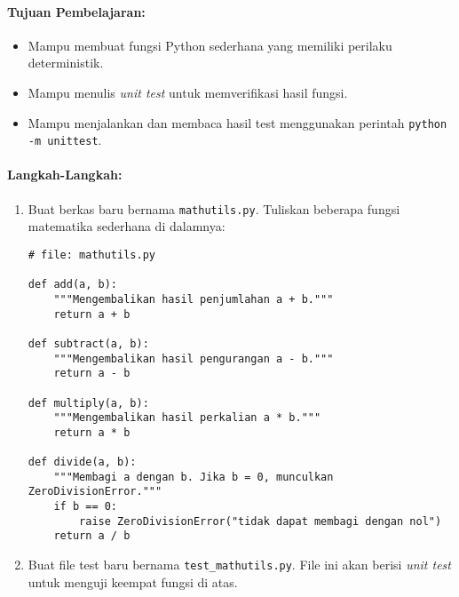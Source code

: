 \paragraph{Tujuan Pembelajaran:}
\begin{itemize}
    \item Mampu membuat fungsi Python sederhana yang memiliki perilaku deterministik.
    \item Mampu menulis \textit{unit test} untuk memverifikasi hasil fungsi.
    \item Mampu menjalankan dan membaca hasil test menggunakan perintah \texttt{python -m unittest}.
\end{itemize}

\paragraph{Langkah-Langkah:}
\begin{enumerate}
    \item Buat berkas baru bernama \texttt{mathutils.py}.  
    Tuliskan beberapa fungsi matematika sederhana di dalamnya:

\begin{lstlisting}[style=PythonStyle, caption={Modul fungsi matematika sederhana}, label={lst:mathutils}]
# file: mathutils.py

def add(a, b):
    """Mengembalikan hasil penjumlahan a + b."""
    return a + b

def subtract(a, b):
    """Mengembalikan hasil pengurangan a - b."""
    return a - b

def multiply(a, b):
    """Mengembalikan hasil perkalian a * b."""
    return a * b

def divide(a, b):
    """Membagi a dengan b. Jika b = 0, munculkan ZeroDivisionError."""
    if b == 0:
        raise ZeroDivisionError("tidak dapat membagi dengan nol")
    return a / b
\end{lstlisting}

    \item Buat file test baru bernama \texttt{test\_mathutils.py}.  
    File ini akan berisi \textit{unit test} untuk menguji keempat fungsi di atas.
\end{enumerate}

